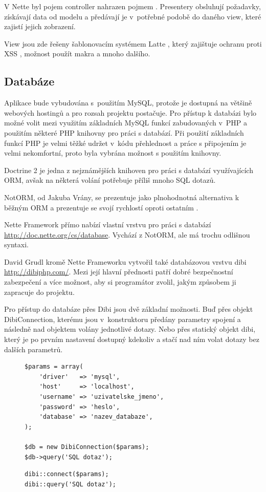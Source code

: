 \documentclass[thesis=B,czech]{FITthesis}[2011/06/14]
\begin{document}
V Nette byl pojem controller nahrazen pojmem . Presentery obsluhují požadavky, získávají data od modelu a předávají je v~potřebné podobě do daného view, které zajistí jejich zobrazení.

View jsou zde řešeny šablonovacím systémem Latte \cite{latte}, který zajištuje ochranu proti XSS \cite{xss}, možnost použít makra a mnoho dalšího.

\subsection{Databáze}
Aplikace bude vybudována s~použitím MySQL, protože je dostupná na většině webových hostingů a pro rozsah projektu postačuje. Pro přístup k databázi bylo možné volit mezi využitím základních MySQL funkcí zabudovaných v~PHP a použitím některé PHP knihovny pro práci s databází. Při použití základních funkcí PHP je velmi těžké udržet v~kódu přehlednost a práce s připojením je velmi nekomfortní, proto byla vybrána možnost s použitím knihovny.

Doctrine 2 je jedna z nejznámějších knihoven pro práci s databází využívajících ORM, avšak na některá volání potřebuje příliš mnoho SQL dotazů.

NotORM, od Jakuba Vrány, se prezentuje jako plnohodnotná alternativa k běžným ORM a prezentuje se svojí rychlostí oproti ostatním \cite{notorm}.

Nette Framework přímo nabízí vlastní vrstvu pro práci s databází \url{http://doc.nette.org/cs/database}. Vychází z NotORM, ale má trochu odlišnou syntaxi.

David Grudl kromě Nette Frameworku vytvořil také databázovou vrstvu dibi \url{http://dibiphp.com/}. Mezi její hlavní přednosti patří dobré bezpečnostní zabezpečení a více možnost, aby si programátor zvolil, jakým způsobem ji zapracuje do projektu.

Pro přístup do databáze přes Dibi jsou dvě základní možnosti. Buď přes objekt DibiConnection, kterému jsou v~konstruktoru předány parametry spojení a následně nad objektem volány jednotlivé dotazy. Nebo přes statický objekt dibi, který je po prvním nastavení dostupný kdekoliv a stačí nad ním volat dotazy bez dalších parametrů.

\begin{figure}[h]
\begin{lstlisting}[caption=použití Dibi s přístupem přes objekt, numbers=none]
$params = array(
    'driver'   => 'mysql',
    'host'     => 'localhost',
    'username' => 'uzivatelske_jmeno',
    'password' => 'heslo',
    'database' => 'nazev_databaze',
);

$db = new DibiConnection($params);
$db->query('SQL dotaz');
\end{lstlisting}

\begin{lstlisting}[caption=použití Dibi se statickým přístupem, numbers=none]
dibi::connect($params);
dibi::query('SQL dotaz');
\end{lstlisting}
\end{figure}
\end{document}
